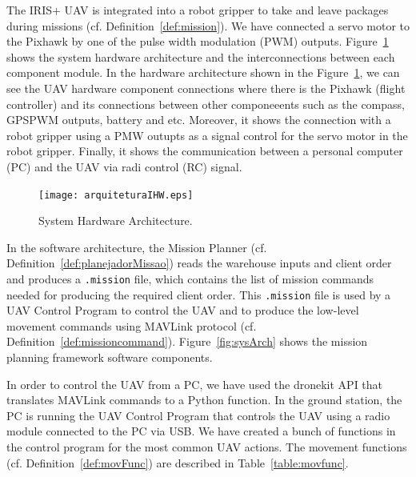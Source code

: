 \documentclass[conference,harvard,brazil,english]{sbatex}
\begin{document}
The IRIS+ UAV is integrated into a robot gripper to take and leave packages during missions (cf. Definition~\ref{def:mission}). We have connected a servo motor to the Pixhawk by one of the pulse width modulation (PWM) outputs. Figure~\ref{fig:hardArch} shows the system hardware architecture and the interconnections between each component module. In the hardware architecture shown in the Figure~\ref{fig:hardArch}, we can see the UAV hardware component connections where there is the Pixhawk (flight controller) and its connections between other componeeents such as the compass, GPSPWM outputs, battery and etc. Moreover, it shows the connection with a robot gripper using a PMW outupts as a signal control for the servo motor in the robot gripper. Finally, it shows the communication between a personal computer (PC) and the UAV via radi control (RC) signal.
%
\begin{figure}[H]
	\centering
	\texttt{[image: arquiteturaIHW.eps]}
	\caption{System Hardware Architecture.}
	\label{fig:hardArch}
\end{figure}

In the software architecture, the Mission Planner (cf. Definition~\ref{def:planejadorMissao}) reads the warehouse inputs and client order and produces a \texttt{.mission} file, which contains the list of mission commands needed for producing the required client order. This \texttt{.mission} file is used by a UAV Control Program to control the UAV and to produce the low-level movement commands using MAVLink protocol (cf. Definition~\ref{def:missioncommand}). Figure~\ref{fig:sysArch} shows the mission planning framework software components.


In order to control the UAV from a PC, we have used the dronekit API that translates MAVLink commands to a Python function. In the ground station, the PC is running the UAV Control Program that controls the UAV using a radio module connected to the PC via USB. We have created a bunch of functions in the control program for the most common UAV actions. The movement functions (cf. Definition~\ref{def:movFunc}) are described in Table~\ref{table:movfunc}.
%
\end{document}
